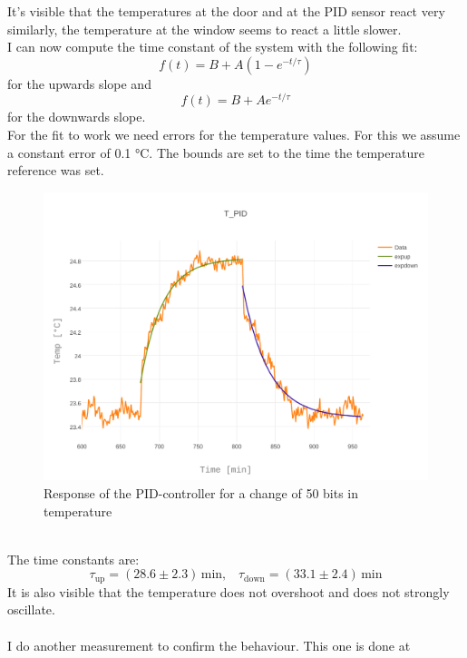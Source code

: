 \documentclass[12pt]{scrartcl}
\begin{document}
      It's visible that the temperatures at the door and at the PID sensor react
      very similarly, the temperature at the window seems to react a little
      slower.\\
      I can now compute the time constant of the system with the following fit:
      \begin{equation*}
        f(t) = B + A(1-e^{-t/\tau})
      \end{equation*}
      for the upwards slope and
      \begin{equation*}
        f(t) = B + A e^{-t/\tau}
      \end{equation*}
      for the downwards slope. \\
      For the fit to work we need errors for the temperature values. For this
      we assume a constant error of 0.1 °C. The bounds are set to the time the
      temperature reference was set.
      \begin{figure}[h!]
        \centering
        \includegraphics[width = \textwidth]{./plots/plot_image(12)}
        \caption{Response of the PID-controller for a change of 50 bits in
        temperature}
        \label{fig13}
      \end{figure}\\
      The time constants are:
      $$\tau_{\text{up}} = (28.6 \pm 2.3) \,\text{min}, \;\;\; \tau_{\text{down}} =
      (33.1 \pm 2.4)\,\text{min}$$
      It is also visible that the temperature does not overshoot and does not
      strongly oscillate. \\\\
      I do another measurement to confirm the behaviour. This one is done at
\end{document}
